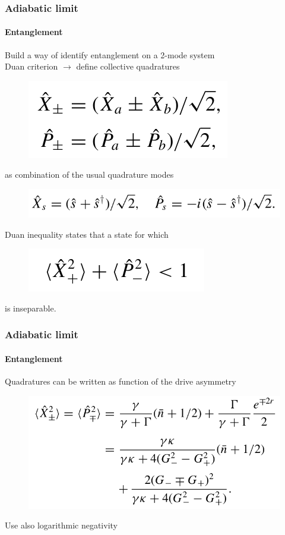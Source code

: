 \documentclass[aspectratio=43]{beamer}
\begin{document}
\begin{frame}
	
	\frametitle{Adiabatic limit}
	\framesubtitle{Entanglement}
	
	Build a way of identify entanglement on a 2-mode system\\
	Duan criterion $\longrightarrow$ define collective quadratures
	\begin{figure}
		\includegraphics[width = 4 cm]{plots/entanglement_quad.png}
	\end{figure}	
	
	as combination of the usual quadrature modes
	\begin{figure}
		\includegraphics[width = 7 cm]{plots/entanglement_quad_2.png}
	\end{figure}

	Duan inequality states that a state for which
	\begin{figure}
		\includegraphics[width = 3.5 cm]{plots/entanglement_duan_criterion.png}
	\end{figure}

	is inseparable.

\end{frame}

\begin{frame}

	\frametitle{Adiabatic limit}
	\framesubtitle{Entanglement}
		
	Quadratures can be written as function of the drive asymmetry 
	\begin{figure}
		\includegraphics[width = 7.5 cm]{plots/entanglement_quadratures.png}
	\end{figure}

	Use also logarithmic negativity 

\end{frame}
\end{document}
